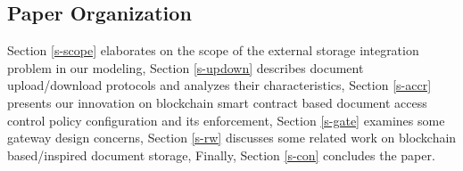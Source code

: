 \subsection{Paper Organization}
Section \ref{s-scope} elaborates on the scope of the external storage integration problem in our modeling, Section \ref{s-updown} describes document upload/download protocols and analyzes their characteristics, Section \ref{s-accr} presents our innovation on blockchain smart contract based document access control policy configuration and its enforcement, Section \ref{s-gate} examines some gateway design concerns, Section \ref{s-rw} discusses some related work on blockchain based/inspired document storage, Finally, Section \ref{s-con} concludes the paper.
